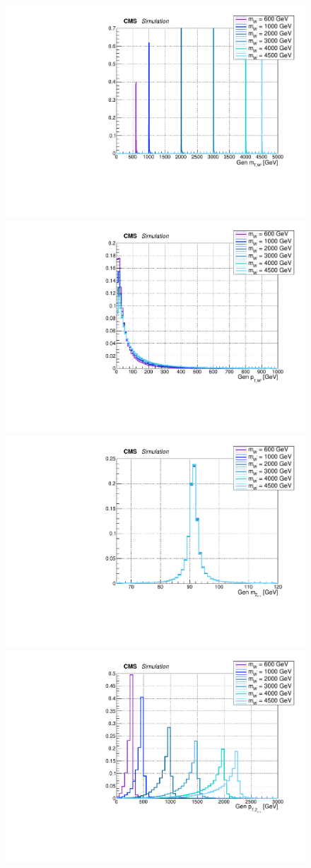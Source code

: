  \begin{figure}[!htb]
   \begin{center}
     \includegraphics[width=.495\textwidth]{Gen_v9/XWZInv_g_XMT.pdf}%
     \includegraphics[width=.495\textwidth]{Gen_v9/XWZInv_g_XPt.pdf}%
     \\
     \includegraphics[width=.495\textwidth]{Gen_v9/XWZInv_g_ZLepMass.pdf}%
     \includegraphics[width=.495\textwidth]{Gen_v9/XWZInv_g_ZLepPt.pdf}%
     \\

\end{center}
\end{figure}
